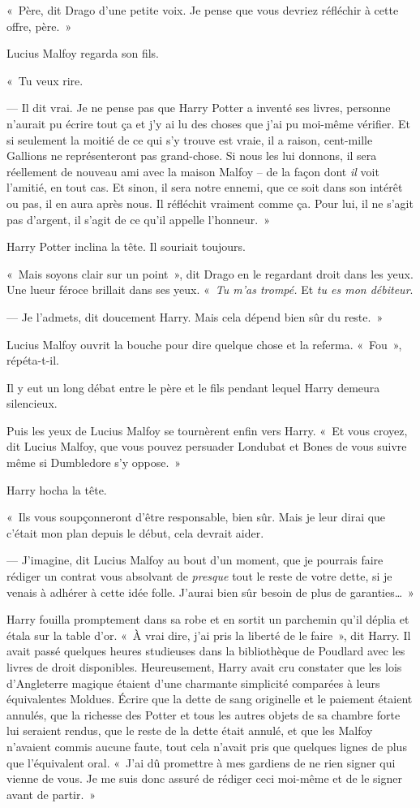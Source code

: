 «~Père, dit Drago d'une petite voix.
Je pense que vous devriez réfléchir à cette offre, père.~»

Lucius Malfoy regarda son fils.

«~Tu veux rire.

--- Il dit vrai.
Je ne pense pas que Harry Potter a inventé ses livres, personne n'aurait pu écrire tout ça et j'y ai lu des choses que j'ai pu moi-même vérifier.
Et si seulement la moitié de ce qui s'y trouve est vraie, il a raison, cent-mille Gallions ne représenteront pas grand-chose.
Si nous les lui donnons, il sera réellement de nouveau ami avec la maison Malfoy -- de la façon dont \emph{il} voit l'amitié, en tout cas.
Et sinon, il sera notre ennemi, que ce soit dans son intérêt ou pas, il en aura après nous.
Il réfléchit vraiment comme ça.
Pour lui, il ne s'agit pas d'argent, il s'agit de ce qu'il appelle l'honneur.~»

Harry Potter inclina la tête.
Il souriait toujours.

«~Mais soyons clair sur un point~», dit Drago en le regardant droit dans les yeux.
Une lueur féroce brillait dans ses yeux.
«~\emph{Tu m'as trompé.} Et \emph{tu es mon débiteur}.

--- Je l'admets, dit doucement Harry.
Mais cela dépend bien sûr du reste.~»

Lucius Malfoy ouvrit la bouche pour dire quelque chose et la referma.
«~Fou~», répéta-t-il.

Il y eut un long débat entre le père et le fils pendant lequel Harry demeura silencieux.

Puis les yeux de Lucius Malfoy se tournèrent enfin vers Harry.
«~Et vous croyez, dit Lucius Malfoy, que vous pouvez persuader Londubat et Bones de vous suivre même si Dumbledore s'y oppose.~»

Harry hocha la tête.

«~Ils vous soupçonneront d'être responsable, bien sûr.
Mais je leur dirai que c'était mon plan depuis le début, cela devrait aider.

--- J'imagine, dit Lucius Malfoy au bout d'un moment, que je pourrais faire rédiger un contrat vous absolvant de \emph{presque} tout le reste de votre dette, si je venais à adhérer à cette idée folle.
J'aurai bien sûr besoin de plus de garanties…~»

Harry fouilla promptement dans sa robe et en sortit un parchemin qu'il déplia et étala sur la table d'or.
«~À vrai dire, j'ai pris la liberté de le faire~», dit Harry.
Il avait passé quelques heures studieuses dans la bibliothèque de Poudlard avec les livres de droit disponibles.
Heureusement, Harry avait cru constater que les lois d'Angleterre magique étaient d'une charmante simplicité comparées à leurs équivalentes Moldues.
Écrire que la dette de sang originelle et le paiement étaient annulés, que la richesse des Potter et tous les autres objets de sa chambre forte lui seraient rendus, que le reste de la dette était annulé, et que les Malfoy n'avaient commis aucune faute, tout cela n'avait pris que quelques lignes de plus que l'équivalent oral.
«~J'ai dû promettre à mes gardiens de ne rien signer qui vienne de vous.
Je me suis donc assuré de rédiger ceci moi-même et de le signer avant de partir.~»

